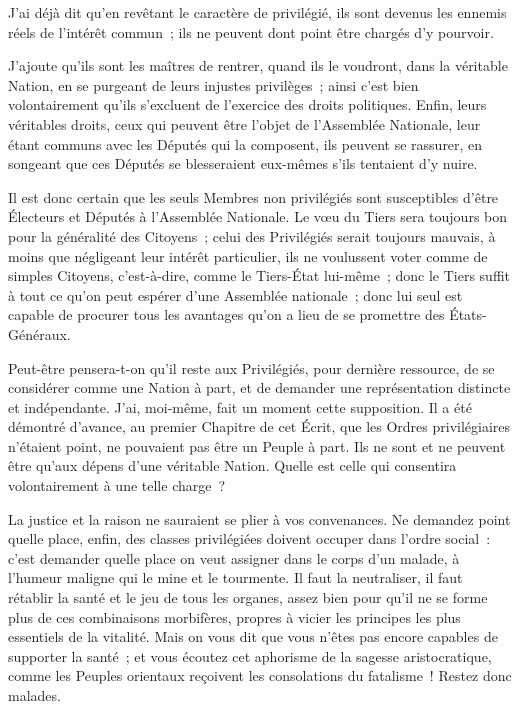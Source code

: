 \documentclass[french,twoside]{book} %
\newcommand\chapterclose{} %
\begin{document}
J’ai déjà dit qu’en revêtant le caractère de privilégié, ils sont devenus les ennemis réels de l’intérêt commun ; ils ne peuvent dont point être chargés d’y pourvoir.\par
J’ajoute qu’ils sont les maîtres de rentrer, quand ils le voudront, dans la véritable Nation, en se purgeant de leurs injustes privilèges ; ainsi c’est bien volontairement qu’ils s’excluent de l’exercice des droits politiques. Enfin, leurs véritables droits, ceux qui peuvent être l’objet de l’Assemblée Nationale, leur étant communs avec les Députés qui la composent, ils peuvent se rassurer, en songeant que ces Députés se blesseraient eux-mêmes s’ils tentaient d’y nuire.\par
Il est donc certain que les seuls Membres non privilégiés sont susceptibles d’être Électeurs et Députés à l’Assemblée Nationale. Le vœu du Tiers sera toujours bon pour la généralité des Citoyens ; celui des Privilégiés serait toujours mauvais, à moins que négligeant leur intérêt particulier, ils ne voulussent voter comme de simples Citoyens, c’est-à-dire, comme le Tiers-État lui-même ; donc le Tiers suffit à tout ce qu’on peut espérer d’une Assemblée nationale ; donc lui seul est capable de procurer tous les avantages qu’on a lieu de se promettre des États-Généraux.\par
Peut-être pensera-t-on qu’il reste aux Privilégiés, pour dernière ressource, de se considérer comme une Nation à part, et de demander une représentation distincte et indépendante. J’ai, moi-même, fait un moment cette supposition. Il a été démontré d’avance, au premier Chapitre de cet Écrit, que les Ordres privilégiaires n’étaient point, ne pouvaient pas être un Peuple à part. Ils ne sont et ne peuvent être qu’aux dépens d’une véritable Nation. Quelle est celle qui consentira volontairement à une telle charge ?\par
La justice et la raison ne sauraient se plier à vos convenances. Ne demandez point quelle place, enfin, des classes privilégiées doivent occuper dans l’ordre social : c’est demander quelle place on veut assigner dans le corps d’un malade, à l’humeur maligne qui le mine et le tourmente. Il faut la neutraliser, il faut rétablir la santé et le jeu de tous les organes, assez bien pour qu’il ne se forme plus de ces combinaisons morbifères, propres à vicier les principes les plus essentiels de la vitalité. Mais on vous dit que vous n’êtes pas encore capables de supporter la santé ; et vous écoutez cet aphorisme de la sagesse aristocratique, comme les Peuples orientaux reçoivent les consolations du fatalisme ! Restez donc malades.
\chapterclose
\end{document}
